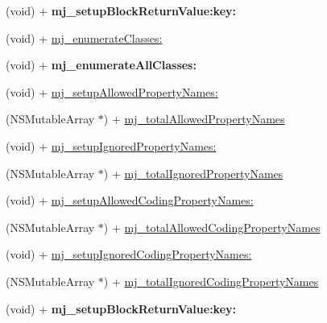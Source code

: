 \begin{DoxyCompactItemize}
\mbox{\label{category_n_s_object_07_m_j_class_08_ac74117e76c2056b27d4db3fa704667f3}} 
(void) + {\bfseries mj\+\_\+setup\+Block\+Return\+Value\+:key\+:}
\item 
(void) + \mbox{\hyperlink{category_n_s_object_07_m_j_class_08_a3f9ef2567bf4f59be9a67cba74dc2cac}{mj\+\_\+enumerate\+Classes\+:}}
\item 
\mbox{\label{category_n_s_object_07_m_j_class_08_a7247385f9e6d741b88bf2b1d93da9896}} 
(void) + {\bfseries mj\+\_\+enumerate\+All\+Classes\+:}
\item 
(void) + \mbox{\hyperlink{category_n_s_object_07_m_j_class_08_a8a14f8d0e4307834475f58536240810f}{mj\+\_\+setup\+Allowed\+Property\+Names\+:}}
\item 
(N\+S\+Mutable\+Array $\ast$) + \mbox{\hyperlink{category_n_s_object_07_m_j_class_08_a3a21a15ef7f5f746a92acc1c1ebcd739}{mj\+\_\+total\+Allowed\+Property\+Names}}
\item 
(void) + \mbox{\hyperlink{category_n_s_object_07_m_j_class_08_afd37a503c0b0d605038315aef0d3ef33}{mj\+\_\+setup\+Ignored\+Property\+Names\+:}}
\item 
(N\+S\+Mutable\+Array $\ast$) + \mbox{\hyperlink{category_n_s_object_07_m_j_class_08_a62bed31696e6d0dd4b3ed5460eaf123e}{mj\+\_\+total\+Ignored\+Property\+Names}}
\item 
(void) + \mbox{\hyperlink{category_n_s_object_07_m_j_class_08_a8b463753f75f643f380cfe86d7223b2d}{mj\+\_\+setup\+Allowed\+Coding\+Property\+Names\+:}}
\item 
(N\+S\+Mutable\+Array $\ast$) + \mbox{\hyperlink{category_n_s_object_07_m_j_class_08_ab44bc8c5c15e061e75ac2a68de745e1a}{mj\+\_\+total\+Allowed\+Coding\+Property\+Names}}
\item 
(void) + \mbox{\hyperlink{category_n_s_object_07_m_j_class_08_ad89c658e8ab42bcba921a1c6e921c1cd}{mj\+\_\+setup\+Ignored\+Coding\+Property\+Names\+:}}
\item 
(N\+S\+Mutable\+Array $\ast$) + \mbox{\hyperlink{category_n_s_object_07_m_j_class_08_a47303fda56f3bc30563926134039a4c1}{mj\+\_\+total\+Ignored\+Coding\+Property\+Names}}
\item 
\mbox{\label{category_n_s_object_07_m_j_class_08_ac74117e76c2056b27d4db3fa704667f3}} 
(void) + {\bfseries mj\+\_\+setup\+Block\+Return\+Value\+:key\+:}
\end{DoxyCompactItemize}


